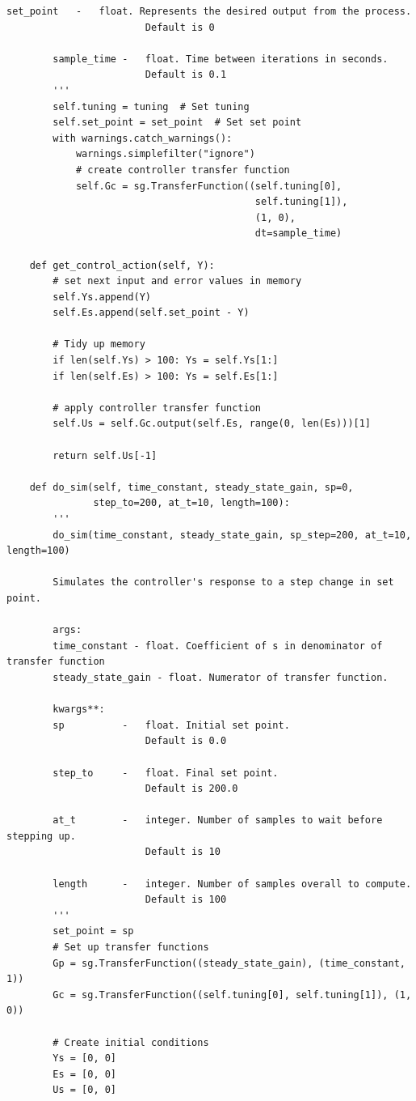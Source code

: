 \documentclass[twoside,a4]{report}
\begin{document}
\begin{Verbatim}[frame=single,fontsize=\footnotesize]
		set_point   -   float. Represents the desired output from the process. 
		                Default is 0
		                
		sample_time -   float. Time between iterations in seconds. 
		                Default is 0.1
		'''
		self.tuning = tuning  # Set tuning
		self.set_point = set_point  # Set set point
		with warnings.catch_warnings():
			warnings.simplefilter("ignore")
			# create controller transfer function
			self.Gc = sg.TransferFunction((self.tuning[0], 
			                               self.tuning[1]), 
			                               (1, 0), 
			                               dt=sample_time)
	
	def get_control_action(self, Y):
		# set next input and error values in memory
		self.Ys.append(Y)
		self.Es.append(self.set_point - Y)
	
		# Tidy up memory
		if len(self.Ys) > 100: Ys = self.Ys[1:]
		if len(self.Es) > 100: Ys = self.Es[1:]
		
		# apply controller transfer function
		self.Us = self.Gc.output(self.Es, range(0, len(Es)))[1]
		
		return self.Us[-1]
	
	def do_sim(self, time_constant, steady_state_gain, sp=0, 
	           step_to=200, at_t=10, length=100):
		'''
		do_sim(time_constant, steady_state_gain, sp_step=200, at_t=10, length=100)
		
		Simulates the controller's response to a step change in set point.
		
		args:
		time_constant - float. Coefficient of s in denominator of transfer function
		steady_state_gain - float. Numerator of transfer function.
		
		kwargs**:
		sp          -   float. Initial set point. 
		                Default is 0.0
		                
		step_to     -   float. Final set point. 
		                Default is 200.0
		                
		at_t        -   integer. Number of samples to wait before stepping up. 
		                Default is 10
		                
		length      -   integer. Number of samples overall to compute. 
		                Default is 100
		'''
		set_point = sp
		# Set up transfer functions
		Gp = sg.TransferFunction((steady_state_gain), (time_constant, 1))
		Gc = sg.TransferFunction((self.tuning[0], self.tuning[1]), (1, 0))
		
		# Create initial conditions
		Ys = [0, 0]
		Es = [0, 0]
		Us = [0, 0]
		

\end{Verbatim}
\end{document}
